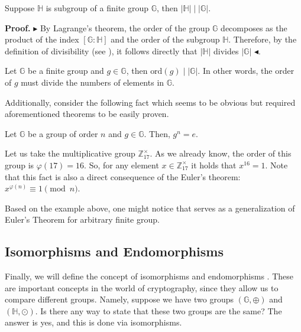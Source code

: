 \documentclass[../lecture-notes-148x210.tex]{subfiles}
\begin{document}
\begin{corollary}
    Suppose $\mathbb{H}$ is subgroup of a finite group $\mathbb{G}$, 
    then $\left| \mathbb{H} \right| \mid \left| \mathbb{G} \right|$.
\end{corollary}

\textbf{Proof.} $\blacktriangleright$ By Lagrange's theorem, the order of the group $\mathbb{G}$ 
decomposes as the product of the index $\left[ \mathbb{G} : \mathbb{H} \right]$ and the order of the 
subgroup $\mathbb{H}$. Therefore, by the definition of divisibility (see ), 
it follows directly that $\left| \mathbb{H} \right|$ divides $\left| \mathbb{G} \right|$ $\blacktriangleleft$.

\begin{corollary}
    Let $\mathbb{G}$ be a finite group and $g \in \mathbb{G}$, 
    then $\text{ord}(g) \mid \left| \mathbb{G} \right|$. In other words, the order of $g$ must 
    divide the numbers of elements in $\mathbb{G}$. 
\end{corollary}

Additionally, consider the following fact which seems to be obvious but required aforementioned 
theorems to be easily proven.

\begin{corollary}\label{corollary:group-exp}
    Let $\mathbb{G}$ be a group of order $n$ and $g \in \mathbb{G}$. Then,
    $g^{n} = e$.
\end{corollary}

\begin{example}
    Let us take the multiplicative group $\mathbb{Z}_{17}^{\times}$. As we
    already know, the order of this group is $\varphi(17) = 16$. So, for any
    element $x \in \mathbb{Z}_{17}^{\times}$ it holds that $x^{16} = 1$. Note
    that this fact is also a direct consequence of the Euler's theorem:
    $x^{\varphi(n)} \equiv 1 \pmod{n}$.
\end{example}

Based on the example above, one might notice that 
serves as a generalization of Euler's Theorem for arbitrary finite group.

\subsection{Isomorphisms and Endomorphisms}

Finally, we will define the concept of isomorphisms and endomorphisms \cite[section 9]{Judson_2012}. These are important concepts in the world of cryptography, since they allow us to compare different groups. Namely, 
suppose we have two groups $(\mathbb{G},\oplus)$ and $(\mathbb{H}, \odot)$. Is there any way to state that these two groups are the same? The answer is yes, and this is done via isomorphisms.
\end{document}

